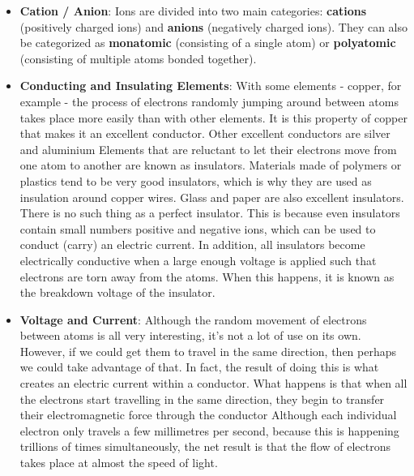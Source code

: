 \documentclass{report}
\begin{document}
\begin{itemize}
            \bigbreak \noindent 
            This process of atoms losing and gaining electrons takes place in a random manner within an element, so some atoms are losing electrons, and some are gaining electrons, causing positive and negative ions to be created all over the place.
        \item \textbf{Cation / Anion}: Ions are divided into two main categories: \textbf{cations} (positively charged ions) and \textbf{anions} (negatively charged ions).
            \bigbreak \noindent 
            They can also be categorized as \textbf{monatomic} (consisting of a single atom) or \textbf{polyatomic} (consisting of multiple atoms bonded together).
        \item \textbf{Conducting and Insulating Elements}: With some elements - copper, for example - the process of electrons randomly jumping around between atoms takes place more easily than with other elements. It is this property of copper that makes it an excellent conductor. Other excellent conductors are silver and aluminium
            \bigbreak \noindent 
            Elements that are reluctant to let their electrons move from one atom to another are known as insulators. Materials made of polymers or plastics tend to be very good insulators, which is why they are used as insulation around copper wires. Glass and paper are also excellent insulators.
            \bigbreak \noindent 
            There is no such thing as a perfect insulator. This is because even insulators contain small numbers positive and negative ions, which can be used to conduct (carry) an electric current. In addition, all insulators become electrically conductive when a large enough voltage is applied such that electrons are torn away from the atoms. When this happens, it is known as the breakdown voltage of the insulator.
        \item \textbf{Voltage and Current}: Although the random movement of electrons between atoms is all very interesting, it's not a lot of use on its own. However, if we could get them to travel in the same direction, then perhaps we could take advantage of that. In fact, the result of doing this is what creates an electric current within a conductor. What happens is that when all the electrons start travelling in the same direction, they begin to transfer their electromagnetic force through the conductor
            \bigbreak \noindent 
            Although each individual electron only travels a few millimetres per second, because this is happening trillions of times simultaneously, the net result is that the flow of electrons takes place at almost the speed of light.

\end{itemize}
\end{document}
